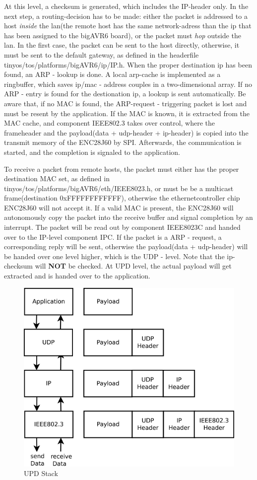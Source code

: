 At this level, a checksum is generated, which includes the IP-header only. In the next step, a routing-decision has to be made: either the packet is addressed to a host \textit{inside} the lan(the remote host has the same network-adress than the ip that has been assigned to the bigAVR6 board), or the packet must \textit{hop} outside the lan. In the first case, the packet can be sent to the host directly, otherwise, it must be sent to the default gateway, as defined in the headerfile tinyos/tos/platforms/bigAVR6/ip/IP.h. When the proper destination ip has been found, an ARP - lookup is done. A local arp-cache is implemented as a ringbuffer, which saves ip/mac - address couples in a two-dimensional array. If no ARP - entry is found for the destionation ip, a lookup is sent automatically. Be aware that, if no MAC is found, the ARP-request - triggering packet is lost and must be resent by the application. If the MAC is known, it is extracted from the MAC cache, and component IEEE802.3 takes over control, where the frameheader and the payload(data + udp-header + ip-header) is copied into the transmit memory of the ENC28J60 by SPI. Afterwards, the communication is started, and the completion is signaled to the application.

To receive a packet from remote hosts, the packet must either has the proper destination MAC set, as defined in tinyos/tos/platforms/bigAVR6/eth/IEEE8023.h, or must be be a multicast frame(destination 0xFFFFFFFFFFFF), otherwise the ethernetcontroller chip ENC28J60 will not accept it. If a valid MAC is present, the ENC28J60 will autonomously copy the packet into the receive buffer and signal completion by an interrupt. The packet will be read out by component IEEE8023C and handed over to the IP-level component IPC. If the packet is a ARP - request, a corresponding reply will be sent, otherwise the payload(data + udp-header) will be handed over one level higher, which is the UDP - level. Note that the ip-checksum will \textbf{NOT} be checked. At UPD level, the actual payload will get extracted and is handed over to the application.

\begin{figure}[h]
 \centerline{\includegraphics[width=.8\columnwidth]{pics/udpstack.png}}
  \caption{UPD Stack}
  \label{fig:udpstack}
\end{figure}


